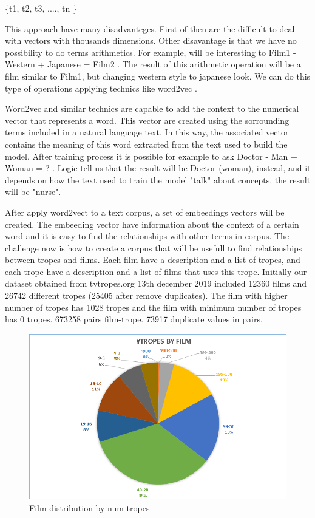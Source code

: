 \documentclass[letterpaper]{article}
\begin{document}
   \{t1, t2, t3, ...., tn \}    
   
This approach have many disadvanteges. First of then are the difficult to deal with vectors with thousands dimensions. Other disavantage is that we have no possibility to do terms arithmetics. For example, will be interesting to Film1 - Western + Japanese = Film2 . The result of this arithmetic operation will be a film similar to Film1, but changing western style to japanese look. We can do this type of operations applying technics like word2vec \cite{mikolov2013}.  

Word2vec and similar technics are capable to add the context to the numerical vector that represents a word. This vector are created using the sorrounding terms included in a natural language text. In this way, the associated vector contains the meaning of this word extracted from the text used to build the model. After training process it is possible for example to ask Doctor - Man + Woman = ? . Logic tell us that the result will be Doctor (woman), instead, and it depends on how the text used to train the model "talk" about concepts, the result will be "nurse".  
   
After apply word2vect to a text corpus, a set of embeedings vectors will be created. The embeeding vector have information about the context of a certain word and it is easy to find the relationships with other terms in corpus. The challenge now is how to create a corpus that will be usefull to find relationships between tropes and films. Each film have a description and a list of tropes, and each trope have a description and a list of films that uses this trope. Initially our dataset obtained from tvtropes.org 13th december 2019 included 12360 films and 26742 different tropes (25405 after remove duplicates). The film with higher number of tropes has 1028 tropes and the film with minimum number of tropes has 0 tropes. 673258 pairs film-trope. 73917 duplicate values in pairs. 


\begin{figure}
	\centering
	\includegraphics{images/num_tropes_by_film}
	\caption[Film distribution by num tropes]{Film distribution by num tropes}
	\label{fig:numtropesbyfilm}
\end{figure}
\end{document}
